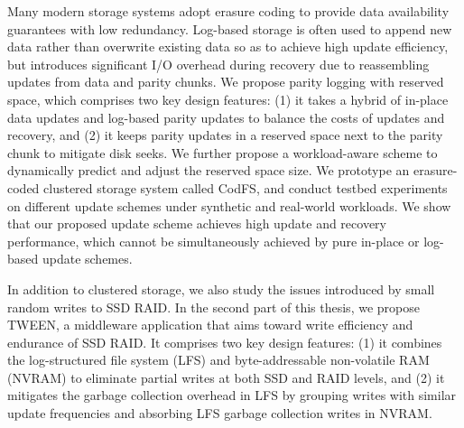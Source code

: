 Many modern storage systems adopt erasure coding to provide data availability
guarantees with low redundancy.  Log-based storage is often used to
append new data rather than overwrite existing data so as to achieve high
update efficiency, but introduces significant \mbox{I/O} overhead during recovery due
to reassembling updates from data and parity chunks.  We propose parity
logging with reserved space, which comprises two key design features: (1) it
takes a hybrid of in-place data updates and log-based parity updates to
balance the costs of updates and recovery, and (2) it keeps parity updates in
a reserved space next to the parity chunk to mitigate disk seeks.  We further
propose a workload-aware scheme to dynamically predict and adjust the reserved
space size.  We prototype an erasure-coded clustered storage system called
CodFS, and conduct testbed experiments on different
update schemes under synthetic and real-world workloads.  We show that
our proposed update scheme achieves high update and recovery
performance, which cannot be simultaneously achieved by pure in-place or
log-based update schemes.

In addition to clustered storage, we also study the issues introduced by small random 
writes to SSD RAID. In the second part of this thesis, 
we propose TWEEN, a middleware application that aims toward write efficiency 
and endurance of SSD RAID.  It comprises two key design features: 
(1) it combines the log-structured file system (LFS) and byte-addressable 
non-volatile RAM (NVRAM) to eliminate partial writes at both SSD and RAID 
levels, and (2) it mitigates the garbage collection overhead in LFS by 
grouping writes with similar update frequencies and absorbing LFS 
garbage collection writes in NVRAM. 
